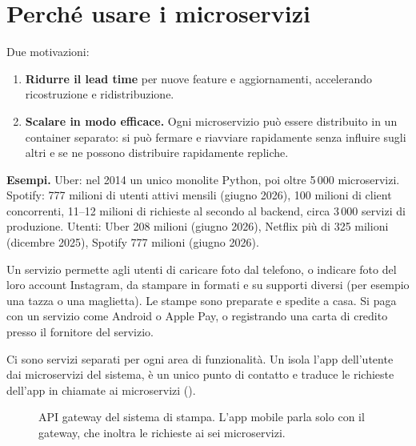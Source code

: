 \section{Perché usare i microservizi}
\label{sec:micro-motivi}

Due motivazioni:
\begin{enumerate}
  \item \textbf{Ridurre il lead time} per nuove feature e aggiornamenti, accelerando ricostruzione e ridistribuzione.
  \item \textbf{Scalare in modo efficace.} Ogni microservizio può essere distribuito in un container separato: si può
    fermare e riavviare rapidamente senza influire sugli altri e se ne possono distribuire rapidamente repliche.
\end{enumerate}

\textbf{Esempi.} Uber: nel 2014 un unico monolite Python, poi oltre 5\,000 microservizi. Spotify: 777 milioni di utenti attivi mensili (giugno 2026),
100 milioni di client concorrenti, 11--12 milioni di richieste al secondo al backend, circa 3\,000 servizi di
produzione. Utenti: Uber 208 milioni (giugno 2026), Netflix più di 325 milioni (dicembre 2025), Spotify 777 milioni
(giugno 2026).

\begin{esempio}
Un servizio permette agli utenti di caricare foto dal telefono, o indicare foto del loro account Instagram, da stampare
in formati e su supporti diversi (per esempio una tazza o una maglietta). Le stampe sono preparate e spedite a casa.
Si paga con un servizio come Android o Apple Pay, o registrando una carta di credito presso il fornitore del servizio.

Ci sono servizi separati per ogni area di funzionalità. Un  isola l'app dell'utente dai
microservizi del sistema, è un unico punto di contatto e traduce le richieste dell'app in chiamate ai microservizi
().
\end{esempio}

\begin{figure}[ht]
\centering
{}
\caption{API gateway del sistema di stampa. L'app mobile parla solo con il gateway, che inoltra le richieste ai sei
microservizi.}
\label{fig:micro-gateway}
\end{figure}

